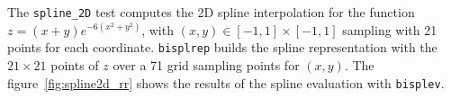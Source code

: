 \documentclass[11pt]{article}
\begin{document}
The \texttt{spline\_2D} test computes the 2D spline interpolation for the function $z=(x+y)e^{-6(x^2+y^2)}$, with $(x,y) \in [-1,1]\times[-1,1]$ sampling with 21 points for each coordinate. \texttt{bisplrep} builds the spline representation with the $21 \times 21$ points of $z$ over a 71 grid sampling points for $(x,y)$. The figure~\ref{fig:spline2d_rr} shows the results of the spline evaluation with \texttt{bisplev}. 



\end{document}
